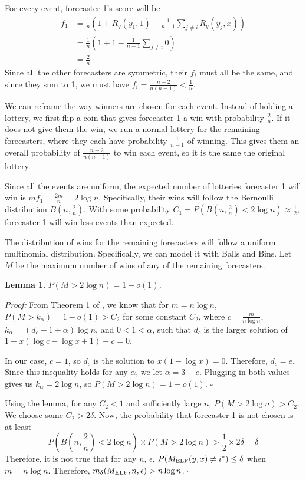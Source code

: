 \documentclass[letterpaper,12pt]{article}
\newcommand{\1}{\mathbbm{1}}
\newcommand*{\QED}{\hfill\ensuremath{\square}}%
\newtheorem{lemma}[theorem]{Lemma}
\begin{document}
For every event, forecaster 1's score will be 
\begin{align*}
  f_1 &= \frac{1}{n}\left(1 + R_q(y_1, 1) - \frac{1}{n-1} \sum_{j \neq i} R_q(y_j, x) \right) \\
      &= \frac{1}{n}\left(1 + 1 - \frac{1}{n-1} \sum_{j \neq i} 0 \right)\\
      &= \frac{2}{n}
\end{align*}
Since all the other forecasters are symmetric, their $f_i$ must all be the same, and since they sum to 1, we must have $f_i = \frac{n-2}{n(n-1)} < \frac{1}{n}$. 

We can reframe the way winners are chosen for each event. Instead of holding a lottery, we first flip a coin that gives forecaster 1 a win with probability $\frac{2}{n}$. If it does not give them the win, we run a normal lottery for the remaining forecasters, where they each have probability $\frac{1}{n-1}$ of winning. This gives them an overall probability of $\frac{n-2}{n(n-1)}$ to win each event, so it is the same the original lottery. 

Since all the events are uniform, the expected number of lotteries forecaster 1 will win is $m f_1 = \frac{2m}{n} = 2 \log n$. Specifically, their wins will follow the Bernoulli distribution $B(n, \frac{2}{n})$. With some probability $C_1 = P(B(n, \frac{2}{n}) < 2\log n) \approx \frac{1}{2}$, forecaster 1 will win less events than expected. 

The distribution of wins for the remaining forecasters will follow a uniform multinomial distribution. Specifically, we can model it with Balls and Bins. Let $M$ be the maximum number of wins of any of the remaining forecasters. 
\begin{lemma}
    $P(M > 2 \log n) = 1 - o(1)$.
\end{lemma}
\emph{Proof:}
From Theorem 1 of \cite{bnb}, we know that for $m = n \log n$, $P(M > k_\alpha) = 1 - o(1) > C_2$ for some constant $C_2$, where $c = \frac{m}{n\log n}$, $k_\alpha = (d_c - 1 + \alpha) \log n$, and $0 < 1 < \alpha$, such that $d_c$ is the larger solution of $1 + x(\log c - \log x + 1) - c= 0$.

In our case, $c = 1$, so $d_c$ is the solution to $x (1 - \log x) = 0$. Therefore, $d_c = e$. Since this inequality holds for any $\alpha$, we let $\alpha = 3 - e$. Plugging in both values gives us $k_\alpha = 2 \log n$, so $P(M > 2 \log n) = 1 - o(1)$. \hfill \QED

Using the lemma, for any $C_2 < 1$ and sufficiently large $n$, $P(M > 2 \log n) > C_2$. We choose some $C_2 > 2\delta$. Now, the probability that forecaster 1 is not chosen is at least
\[
  P(B(n, \frac{2}{n}) < 2\log n) \times P(M > 2 \log n) > \frac{1}{2} \times 2\delta = \delta
\]
Therefore, it is not true that for any $n$, $\epsilon$, $P(M_{\mathrm{ELF}}(y, x) \neq i^*) \leq \delta$ when $m = n \log n$. Therefore, $m_\delta(M_{\mathrm{ELF}}, n, \epsilon) > n \log n$. 
\hfill \QED
\end{document}
